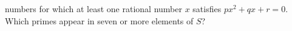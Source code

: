 numbers for which at least one rational number $x$ satisfies $px^2 + qx +
r =0$. Which primes appear in seven or more elements of $S$?

